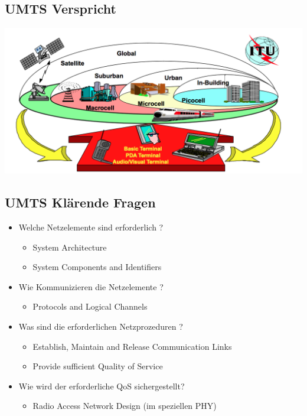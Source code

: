 \begin{minipage}{0.5\linewidth}
\subsection{UMTS Verspricht}
\includegraphics[width = \linewidth]{./Pics/UMTS2}
\end{minipage}
\begin{minipage}{0.5\linewidth}
\subsection{UMTS Klärende Fragen}
\begin{itemize}
\item Welche Netzelemente sind erforderlich ? 
\begin{itemize}
\item System Architecture
\item System Components and Identifiers
\end{itemize}
\item Wie Kommunizieren die Netzelemente ?
\begin{itemize}
\item Protocols and Logical Channels
\end{itemize}
\item Was sind die erforderlichen Netzprozeduren ? 
\begin{itemize}
\item Establish, Maintain and Release Communication Links
\item Provide sufficient Quality of Service
\end{itemize}
\item Wie wird der erforderliche QoS sichergestellt?
\begin{itemize}
\item Radio Access Network Design (im speziellen PHY)
\end{itemize}
\end{itemize}
\end{minipage}

